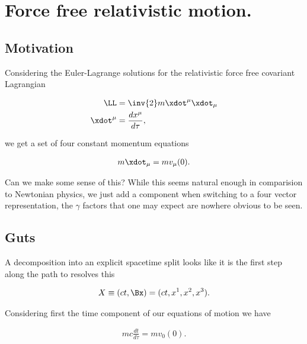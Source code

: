 

\chapter{Force free relativistic motion.}
\label{chap:constFourMomentum}
{}
\date{Nov 15, 2009}

\beginArtNoToc

\section{Motivation}

Considering the Euler-Lagrange solutions for the relativistic force free covariant Lagrangian

\begin{align}\label{eqn:constFourMomentum:qqq1}
\LL &= \inv{2} m \xdot^\mu \xdot_\mu \\
\xdot^\mu &= \frac{d x^\mu}{d \tau},
\end{align}

we get a set of four constant momentum equations

\begin{align}\label{eqn:constFourMomentum:qqq5}
m \xdot_\mu = m v_\mu(0).
\end{align}

Can we make some sense of this?  While this seems natural enough in comparision to Newtonian physics, we just add a component when switching to a four vector representation, the $\gamma$ factors that one may expect are nowhere obvious to be seen.  

\section{Guts}

A decomposition into an explicit spacetime split looks like it is the first step along the path to resolves this

\begin{align}\label{eqn:constFourMomentum:qqq6}
X \equiv (c t, \Bx) = (ct, x^1, x^2, x^3).
\end{align}

Considering first the time component of our equations of motion we have

\begin{align}\label{eqn:constFourMomentum:qqq7}
m c \frac{dt}{d\tau} = m v_0(0).
\end{align}

